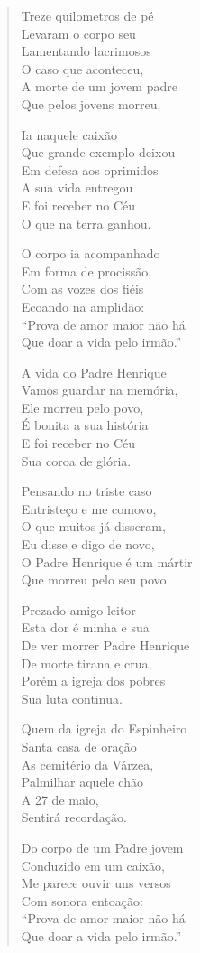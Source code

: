 \begin{verse}
Treze quilometros de pé\\
Levaram o corpo seu\\
Lamentando lacrimosos\\
O caso que aconteceu,\\
A morte de um jovem padre\\
Que pelos jovens morreu.

Ia naquele caixão\\
Que grande exemplo deixou\\
Em defesa aos oprimidos\\
A sua vida entregou\\
E foi receber no Céu\\
O que na terra ganhou.

O corpo ia acompanhado\\
Em forma de procissão,\\
Com as vozes dos fiéis\\
Ecoando na amplidão:\\
``Prova de amor maior não há\\
Que doar a vida pelo irmão.''

A vida do Padre Henrique\\
Vamos guardar na memória,\\
Ele morreu pelo povo,\\
É bonita a sua história\\
E foi receber no Céu\\
Sua coroa de glória.

Pensando no triste caso\\
Entristeço e me comovo,\\
O que muitos já disseram,\\
Eu disse e digo de novo,\\
O Padre Henrique é um mártir\\
Que morreu pelo seu povo.

Prezado amigo leitor\\
Esta dor é minha e sua\\
De ver morrer Padre Henrique\\
De morte tirana e crua,\\
Porém a igreja dos pobres\\
Sua luta continua.

Quem da igreja do Espinheiro\\
Santa casa de oração\\
As cemitério da Várzea,\\
Palmilhar aquele chão\\
A 27 de maio,\\
Sentirá recordação.

Do corpo de um Padre jovem\\
Conduzido em um caixão,\\
Me parece ouvir uns versos\\
Com sonora entoação:\\
``Prova de amor maior não há\\
Que doar a vida pelo irmão.''
\end{verse}

